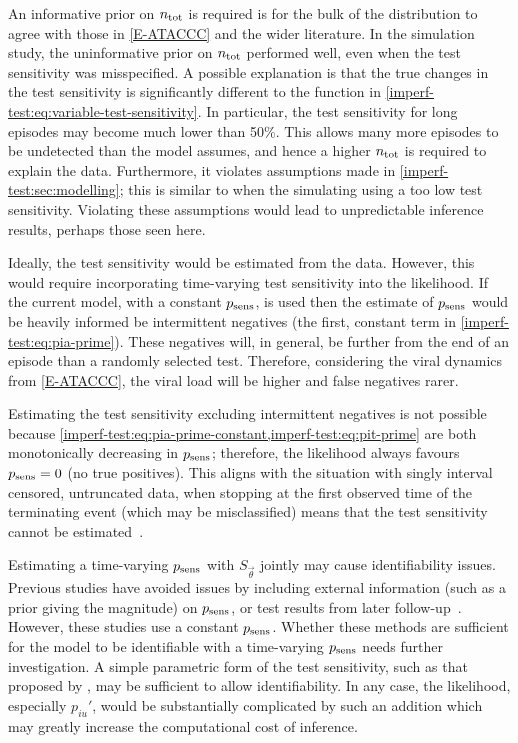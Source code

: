 \documentclass[thesis.tex]{subfiles}
\begin{document}
An informative prior on $n_\text{tot}$ is required is for the bulk of the distribution to agree with those in \cref{E-ATACCC} and the wider literature.
In the simulation study, the uninformative prior on $n_\text{tot}$ performed well, even when the test sensitivity was misspecified.
A possible explanation is that the true changes in the test sensitivity is significantly different to the function in \cref{imperf-test:eq:variable-test-sensitivity}.
In particular, the test sensitivity for long episodes may become much lower than 50\%.
This allows many more episodes to be undetected than the model assumes, and hence a higher $n_\text{tot}$ is required to explain the data.
Furthermore, it violates assumptions made in \cref{imperf-test:sec:modelling}; this is similar to when the simulating using a too low test sensitivity.
Violating these assumptions would lead to unpredictable inference results, perhaps those seen here.

Ideally, the test sensitivity would be estimated from the data.
However, this would require incorporating time-varying test sensitivity into the likelihood.
If the current model, with a constant $p_\text{sens}$, is used then the estimate of $p_\text{sens}$ would be heavily informed be intermittent negatives (the first, constant term in \cref{imperf-test:eq:pia-prime}).
These negatives will, in general, be further from the end of an episode than a randomly selected test.
Therefore, considering the viral dynamics from \cref{E-ATACCC}, the viral load will be higher and false negatives rarer.

Estimating the test sensitivity excluding intermittent negatives is not possible because \cref{imperf-test:eq:pia-prime-constant,imperf-test:eq:pit-prime} are both monotonically decreasing in $p_\text{sens}$; therefore, the likelihood always favours $p_\text{sens} = 0$ (\ie no true positives).
This aligns with the situation with singly interval censored, untruncated data, when stopping at the first observed time of the terminating event (which may be misclassified) means that the test sensitivity cannot be estimated~\autocite[e.g.]{titmanMisclassify}.

Estimating a time-varying $p_\text{sens}$ with $S_{\vec{\theta}}$ jointly may cause identifiability issues.
Previous studies have avoided issues by including external information (such as a prior giving the magnitude) on $p_\text{sens}$, or test results from later follow-up~\autocite[and references therein]{piresIntervalMisclassify}.
However, these studies use a constant $p_\text{sens}$.
Whether these methods are sufficient for the model to be identifiable with a time-varying $p_\text{sens}$ needs further investigation.
A simple parametric form of the test sensitivity, such as that proposed by \textcite{brownBayesian}, may be sufficient to allow identifiability.
In any case, the likelihood, especially $p_{iu}'$, would be substantially complicated by such an addition which may greatly increase the computational cost of inference.
\end{document}
